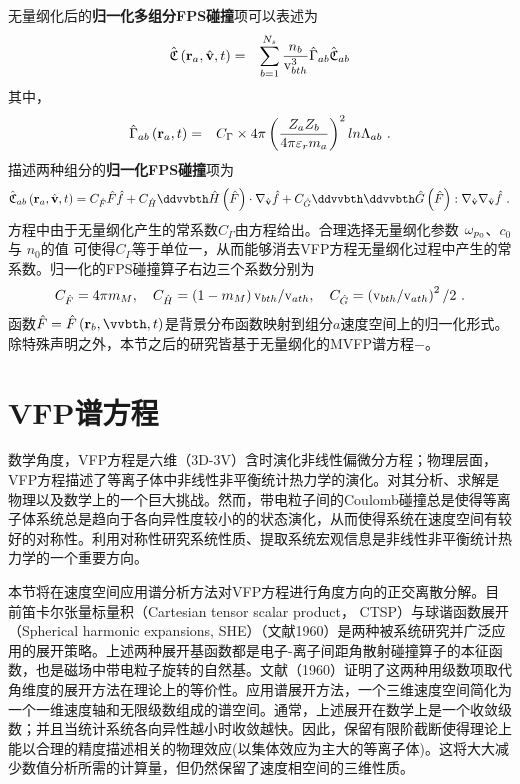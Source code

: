   无量纲化后的\textbf{归一化多组分FPS碰撞}项可以表述为
  \begin{eqnarray}
      \hat{\mathfrak{C}} \left(\mathbf{r}_a,\hat{\mathbf{v}},t \right) &=& \sum_{b=1}^{N_s} \frac{n_b}{\mathrm{v}_{bth}^3} \hat{\Gamma}_{ab} \hat{\mathfrak{C}}_{ab} \label{FPShda}
  \end{eqnarray}
  其中，
  \begin{eqnarray}
      \hat{\Gamma}_{ab} \left(\mathbf{r}_a,t \right) &=& C_{\Gamma} \times 4 \pi \left(\frac{Z_a Z_b}{4 \pi \varepsilon_r m_a} \right)^2 ln \Lambda_{ab} ~. \label{Gabh}
  \end{eqnarray}
  描述两种组分的\textbf{归一化FPS碰撞}项为
  \begin{eqnarray}
      \colhab \left(\r_a,\vh,t \right) =  \CFh \Fh \fh + \CHh \ddvvbth \HFh \cdot \ddbfvh \fh + \CGh \ddvvbth \ddvvbth \GFh : \ddbfvh \ddbfvh \fh ~. \label{FPShdab}
  \end{eqnarray}
  方程中由于无量纲化产生的常系数$C_{\Gamma}$由方程给出。合理选择无量纲化参数 $\omega_{p_0}$、$c_0$ 与 $n_0$的值 可使得$C_{\Gamma}$等于单位一，从而能够消去VFP方程无量纲化过程中产生的常系数。归一化的FPS碰撞算子右边三个系数分别为
  \begin{eqnarray}
      C_{\hat{F}}=4\pi m_M,  \quad  
      C_{\hat{H}}=\left(1-m_M \right) \mathrm{v}_{bth} / \mathrm{v}_{ath}, \quad 
      C_{\hat{G}}=\left(\mathrm{v}_{bth} / \mathrm{v}_{ath} \right)^2 / 2
      ~. \label{CFHGh}
  \end{eqnarray}
  函数$\Fh=\Fh\left(\r_b,\vvbth,t \right)$是背景分布函数映射到组分$a$速度空间上的归一化形式。除特殊声明之外，本节之后的研究皆基于无量纲化的MVFP谱方程$-$。
 

\section{VFP谱方程}
\label{VFP谱方程}

  数学角度，VFP方程是六维（3D-3V）含时演化非线性偏微分方程；物理层面，VFP方程描述了等离子体中非线性非平衡统计热力学的演化。对其分析、求解是物理以及数学上的一个巨大挑战。然而，带电粒子间的Coulomb碰撞总是使得等离子体系统总是趋向于各向异性度较小的的状态演化，从而使得系统在速度空间有较好的对称性。利用对称性研究系统性质、提取系统宏观信息是非线性非平衡统计热力学的一个重要方向。

  本节将在速度空间应用谱分析方法对VFP方程进行角度方向的正交离散分解。目前笛卡尔张量标量积（Cartesian tensor scalar product， CTSP）与球谐函数展开（Spherical harmonic expansions, SHE）（文献1960）是两种被系统研究并广泛应用的展开策略。上述两种展开基函数都是电子-离子间距角散射碰撞算子的本征函数，也是磁场中带电粒子旋转的自然基。文献（1960）证明了这两种用级数项取代角维度的展开方法在理论上的等价性。应用谱展开方法，一个三维速度空间简化为一个一维速度轴和无限级数组成的谱空间。通常，上述展开在数学上是一个收敛级数；并且当统计系统各向异性越小时收敛越快。因此，保留有限阶截断使得理论上能以合理的精度描述相关的物理效应(以集体效应为主大的等离子体)。这将大大减少数值分析所需的计算量，但仍然保留了速度相空间的三维性质。
  
